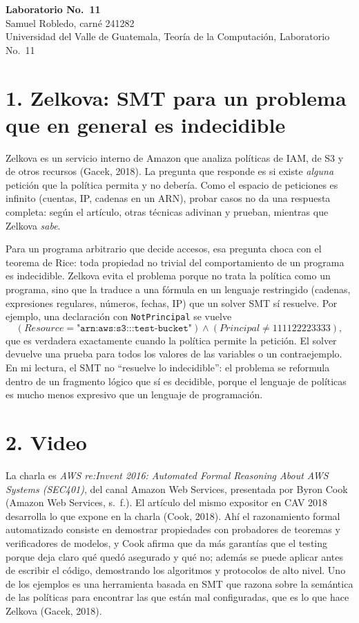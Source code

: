 \documentclass[11pt,letterpaper]{article}
\begin{document}
\begin{center}
{\Large\bfseries Laboratorio No.\ 11}\\[4pt]
Samuel Robledo, carné 241282\\
Universidad del Valle de Guatemala, Teoría de la Computación, Laboratorio No.\ 11
\end{center}

\section*{1. Zelkova: SMT para un problema que en general es indecidible}

Zelkova es un servicio interno de Amazon que analiza políticas de IAM, de S3 y de otros recursos (Gacek, 2018). La pregunta que responde es si existe \emph{alguna} petición que la política permita y no debería. Como el espacio de peticiones es infinito (cuentas, IP, cadenas en un ARN), probar casos no da una respuesta completa: según el artículo, otras técnicas adivinan y prueban, mientras que Zelkova \emph{sabe}.

Para un programa arbitrario que decide accesos, esa pregunta choca con el teorema de Rice: toda propiedad no trivial del comportamiento de un programa es indecidible. Zelkova evita el problema porque no trata la política como un programa, sino que la traduce a una fórmula en un lenguaje restringido (cadenas, expresiones regulares, números, fechas, IP) que un solver SMT sí resuelve. Por ejemplo, una declaración con \texttt{NotPrincipal} se vuelve
\[
(\mathit{Resource} = \texttt{"arn:aws:s3:::test-bucket"}) \wedge (\mathit{Principal} \neq 111122223333),
\]
que es verdadera exactamente cuando la política permite la petición. El solver devuelve una prueba para todos los valores de las variables o un contraejemplo. En mi lectura, el SMT no ``resuelve lo indecidible'': el problema se reformula dentro de un fragmento lógico que sí es decidible, porque el lenguaje de políticas es mucho menos expresivo que un lenguaje de programación.

\section*{2. Video}

La charla es \emph{AWS re:Invent 2016: Automated Formal Reasoning About AWS Systems (SEC401)}, del canal Amazon Web Services, presentada por Byron Cook (Amazon Web Services, s.~f.). El artículo del mismo expositor en CAV 2018 desarrolla lo que expone en la charla (Cook, 2018). Ahí el razonamiento formal automatizado consiste en demostrar propiedades con probadores de teoremas y verificadores de modelos, y Cook afirma que da más garantías que el testing porque deja claro qué quedó asegurado y qué no; además se puede aplicar antes de escribir el código, demostrando los algoritmos y protocolos de alto nivel. Uno de los ejemplos es una herramienta basada en SMT que razona sobre la semántica de las políticas para encontrar las que están mal configuradas, que es lo que hace Zelkova (Gacek, 2018).
\end{document}
